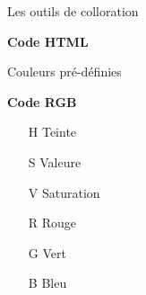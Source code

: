 \documentclass[10pt,svgnames,usenames,table]{beamer}
\begin{document}
\begin{frame}{Les outils de colloration}
\begin{minipage}[t]{0.49\textwidth}
	\textbf{Code HTML}
	
	\vspace{0.2cm}
	Couleurs pré-définies
	
	\vspace{0.2cm}
	
	\begin{center}
	\end{center}

\end{minipage}\hfill
\begin{minipage}[t]{0.49\textwidth}
	\textbf{Code RGB}
	
	\begin{itemize}
		\item[H] Teinte
		\item[S] Valeure 
		\item[V] Saturation
		\item[R] Rouge
		\item[G] Vert 
		\item[B] Bleu
	\end{itemize}
	
\end{minipage}

\end{frame}
\end{document}
